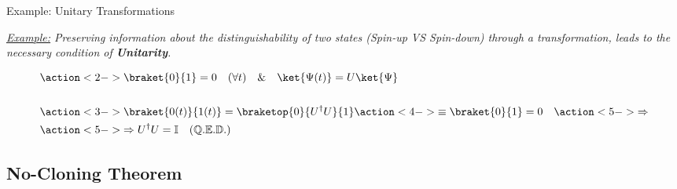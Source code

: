 \documentclass[9pt, handout, aspectratio=169]{beamer}		%
\begin{document}
	\begin{frame}{Example: Unitary Transformations}
		
		\textit{\underline{Example:} Preserving information about the distinguishability of two states (Spin-up VS Spin-down) through a transformation, leads to the necessary condition of \textbf{Unitarity}.}
		
		\begin{align*}
			&\action<2->{ \braket{0}{1} =0 \quad (\forall t) \quad \& \quad \ket{\Psi (t)} = U\ket{\Psi} } \\
			 \\
			&\action<3->{ \braket{0(t)}{1(t)} = \braketop{0}{U^\dagger U}{1} } \action<4->{ \equiv \braket{0}{1}=0 \quad } \action<5->{ \Rightarrow } \\
			&\action<5->{ \Rightarrow U^\dagger U = \mathbb{I} \quad \mathbb{(Q.E.D.)} } 
		\end{align*}
		
		
	\end{frame}
	
	
	\subsection{No-Cloning Theorem}
\end{document}
